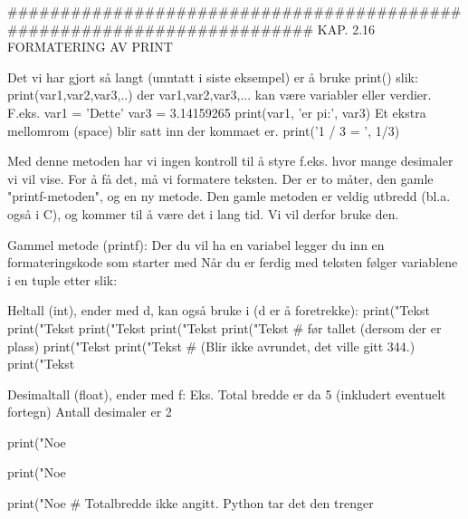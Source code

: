 {######################################################################## 
KAP. 2.16  FORMATERING AV PRINT  

Det vi har gjort så langt (unntatt i siste eksempel) er å bruke print() slik:
print(var1,var2,var3,..) der var1,var2,var3,... kan være variabler eller verdier.
F.eks.
var1 = 'Dette'
var3 = 3.14159265
print(var1, 'er pi:', var3)
Et ekstra mellomrom (space) blir satt inn der kommaet er. 
print('1 / 3 = ', 1/3)

Med denne metoden har vi ingen kontroll til å styre f.eks. hvor mange desimaler vi vil vise.
For å få det, må vi formatere teksten.
Der er to måter, den gamle "printf-metoden", og en ny metode.
Den gamle metoden er veldig utbredd (bl.a. også i C), og kommer til å være det i lang tid.
Vi vil derfor bruke den. 


Gammel metode (printf):
Der du vil ha en variabel legger du inn en formateringskode som starter 
med %
Når du er ferdig med teksten følger variablene i en tuple etter %
slik: %


Heltall (int), ender med d, kan også bruke i (d er å foretrekke):
print("Tekst %
print("Tekst %
print("Tekst %
print("Tekst %
print("Tekst %
                                   # før tallet (dersom der er plass) 
print("Tekst %
print("Tekst %
                                   # (Blir ikke avrundet, det ville gitt 344.)  
print("Tekst %


Desimaltall (float), ender med f:  %
Eks. %
  Total bredde er da 5 (inkludert eventuelt fortegn)
  Antall desimaler er 2

print("Noe %

print("Noe %

print("Noe %
                                     # Totalbredde ikke angitt. Python tar det den trenger

}
